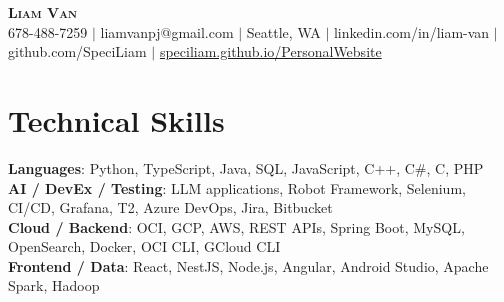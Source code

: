 \documentclass[letterpaper,11pt]{article}
\begin{document}

%
\begin{center}
    \textbf{\Huge \scshape Liam Van} \\ \vspace{1pt}
    \small 678-488-7259 $|$ \small {liamvanpj@gmail.com} $|$ Seattle, WA
 {{$|$ linkedin.com/in/liam-van} {$|$ github.com/SpeciLiam} {$|$ \href{https://speciliam.github.io/PersonalWebsite}{speciliam.github.io/PersonalWebsite}}}

\end{center}

\section{Technical Skills}
 \begin{itemize}[leftmargin=0.15in, label={}]
    \small{\item{
     \textbf{Languages}{: Python, TypeScript, Java, SQL, JavaScript, C++, C\#, C, PHP} \\
     \textbf{AI / DevEx / Testing}{: LLM applications, Robot Framework, Selenium, CI/CD, Grafana, T2, Azure DevOps, Jira, Bitbucket} \\
     \textbf{Cloud / Backend}{: OCI, GCP, AWS, REST APIs, Spring Boot, MySQL, OpenSearch, Docker, OCI CLI, GCloud CLI} \\
     \textbf{Frontend / Data}{: React, NestJS, Node.js, Angular, Android Studio, Apache Spark, Hadoop} \\
    }}
 \end{itemize}
%
\end{document}
